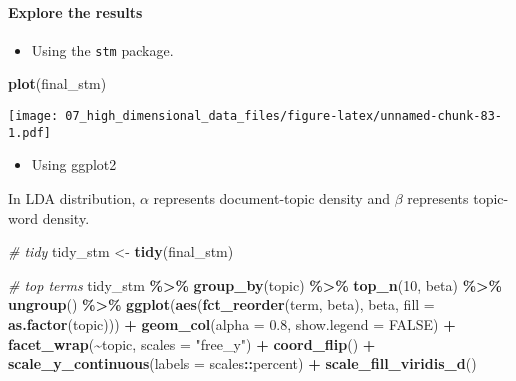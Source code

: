 \documentclass[
]{book}
\newenvironment{Shaded}{\begin{snugshade}}{\end{snugshade}}
\newcommand{\CommentTok}[1]{\textcolor[rgb]{0.56,0.35,0.01}{\textit{#1}}}
\newcommand{\DataTypeTok}[1]{\textcolor[rgb]{0.13,0.29,0.53}{#1}}
\newcommand{\DecValTok}[1]{\textcolor[rgb]{0.00,0.00,0.81}{#1}}
\newcommand{\FloatTok}[1]{\textcolor[rgb]{0.00,0.00,0.81}{#1}}
\newcommand{\KeywordTok}[1]{\textcolor[rgb]{0.13,0.29,0.53}{\textbf{#1}}}
\newcommand{\NormalTok}[1]{#1}
\newcommand{\OperatorTok}[1]{\textcolor[rgb]{0.81,0.36,0.00}{\textbf{#1}}}
\newcommand{\OtherTok}[1]{\textcolor[rgb]{0.56,0.35,0.01}{#1}}
\newcommand{\StringTok}[1]{\textcolor[rgb]{0.31,0.60,0.02}{#1}}
\providecommand{\tightlist}{%
  \setlength{\itemsep}{0pt}\setlength{\parskip}{0pt}}
\begin{document}
\hypertarget{explore-the-results}{%
\paragraph{Explore the results}\label{explore-the-results}}

\begin{itemize}
\tightlist
\item
  Using the \texttt{stm} package.
\end{itemize}

\begin{Shaded}
\begin{Highlighting}[]
\KeywordTok{plot}\NormalTok{(final\_stm)}
\end{Highlighting}
\end{Shaded}

\texttt{[image: 07\_high\_dimensional\_data\_files/figure-latex/unnamed-chunk-83-1.pdf]}

\begin{itemize}
\tightlist
\item
  Using ggplot2
\end{itemize}

In LDA distribution, \(\alpha\) represents document-topic density and \(\beta\) represents topic-word density.

\begin{Shaded}
\begin{Highlighting}[]
\CommentTok{\# tidy}
\NormalTok{tidy\_stm \textless{}{-}}\StringTok{ }\KeywordTok{tidy}\NormalTok{(final\_stm)}

\CommentTok{\# top terms}
\NormalTok{tidy\_stm }\OperatorTok{\%\textgreater{}\%}
\StringTok{  }\KeywordTok{group\_by}\NormalTok{(topic) }\OperatorTok{\%\textgreater{}\%}
\StringTok{  }\KeywordTok{top\_n}\NormalTok{(}\DecValTok{10}\NormalTok{, beta) }\OperatorTok{\%\textgreater{}\%}
\StringTok{  }\KeywordTok{ungroup}\NormalTok{() }\OperatorTok{\%\textgreater{}\%}
\StringTok{  }\KeywordTok{ggplot}\NormalTok{(}\KeywordTok{aes}\NormalTok{(}\KeywordTok{fct\_reorder}\NormalTok{(term, beta), beta, }\DataTypeTok{fill =} \KeywordTok{as.factor}\NormalTok{(topic))) }\OperatorTok{+}
\StringTok{  }\KeywordTok{geom\_col}\NormalTok{(}\DataTypeTok{alpha =} \FloatTok{0.8}\NormalTok{, }\DataTypeTok{show.legend =} \OtherTok{FALSE}\NormalTok{) }\OperatorTok{+}
\StringTok{  }\KeywordTok{facet\_wrap}\NormalTok{(}\OperatorTok{\textasciitilde{}}\NormalTok{topic, }\DataTypeTok{scales =} \StringTok{"free\_y"}\NormalTok{) }\OperatorTok{+}
\StringTok{  }\KeywordTok{coord\_flip}\NormalTok{() }\OperatorTok{+}
\StringTok{  }\KeywordTok{scale\_y\_continuous}\NormalTok{(}\DataTypeTok{labels =}\NormalTok{ scales}\OperatorTok{::}\NormalTok{percent) }\OperatorTok{+}
\StringTok{  }\KeywordTok{scale\_fill\_viridis\_d}\NormalTok{()}
\end{Highlighting}
\end{Shaded}
\end{document}

